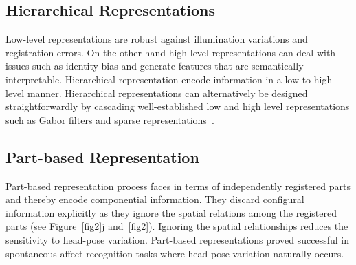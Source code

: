 \documentclass[10pt,twocolumn,letterpaper]{article}
\begin{document}
	\subsection*{Hierarchical Representations}
	Low-level representations are robust against illumination variations and registration errors. On the other hand high-level representations can deal with issues such as identity bias and generate features that are semantically interpretable. Hierarchical representation encode information in a low to high level manner. Hierarchical representations can alternatively be designed straightforwardly by cascading well-established low and high level representations such as Gabor filters and sparse representations~\cite{Cotter2010Sparse}.
	\subsection*{Part-based Representation}
	Part-based representation process faces in terms of independently registered parts and thereby encode componential information. They discard configural information explicitly as they ignore the spatial relations among the registered parts (see Figure~\ref{fig2}j and~\ref{fig2}). Ignoring the spatial relationships reduces the sensitivity to head-pose variation. Part-based representations proved successful in spontaneous affect recognition tasks where head-pose variation naturally occurs.
	{\small
		
		
	}
\end{document}
